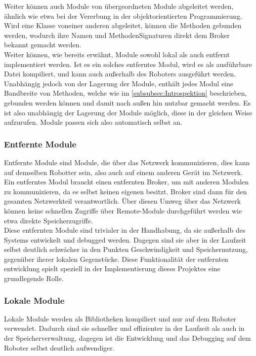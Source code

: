 \noindent
Weiter können auch Module von übergeordneten Module abgeleitet werden, ähnlich wie etwa bei der Vererbung in der objektorientierten Programmierung. Wird eine Klasse voneiner anderen abgeleitet, können die Methoden gebunden werden, wodurch ihre Namen und MethodenSignaturen direkt dem Broker bekannt gemacht werden.
\\

\noindent
Weiter können, wie bereits erwähnt, Module sowohl lokal als auch entfernt implementiert werden. Ist es ein solches entferntes Modul, wird es als ausführbare Datei kompiliert, und kann auch außerhalb des Roboters ausgeführt werden.
\\

\noindent
Unabhängig jedoch von der Lagerung der Module, enthält jedes Modul eine Bandbreite von Methoden, welche wie im \autoref{subsubsec:Introspektion} beschrieben, gebunden werden können und damit nach außen hin nutzbar gemacht werden. Es ist also unabhängig der Lagerung der Module möglich, diese in der gleichen Weise aufzurufen. Module passen sich also automatisch selbst an.\\

\subsubsection{Entfernte Module}\label{subsubsec:EntfernteModule}
Entfernte Module sind Module, die über das Netzwerk kommunizieren, dies kann auf demselben Robotter sein, also auch auf einem anderen Gerät im Netzwerk. Ein entferntes Modul braucht einen entfernten Broker, um mit anderen Modulen zu kommunizieren, da es selbst keinen eigenen besitzt. Broker sind dann für den gesamten Netzwerkteil verantwortlich. Über diesen Umweg über das Netzwerk können keine schnellen Zugriffe über Remote-Module durchgeführt werden wie etwa direkte Speicherzugriffe.
\\

\noindent
Diese entfernten Module sind trivialer in der Handhabung, da sie außerhalb des Systems entwickelt und debugged werden. Dagegen sind sie aber in der Laufzeit selbst deutlich schwächer in den Punkten Geschwindigkeit und Speichernutzung, gegenüber iherer lokalen Gegenstücke. Diese Funktionalität der entfernten entwicklung spielt speziell in der Implementierung dieses Projektes eine grundlegende Rolle.\\

\subsubsection{Lokale Module}\label{subsubsec:LokaleModule}
Lokale Module werden als Bibliotheken kompiliert und nur auf dem Roboter verwendet. Dadurch sind sie schneller und effizienter in der Laufzeit als auch in der Speicherverwaltung, dagegen ist die Entwicklung und das Debugging auf dem Roboter selbst deutlich aufwendiger.
\\


